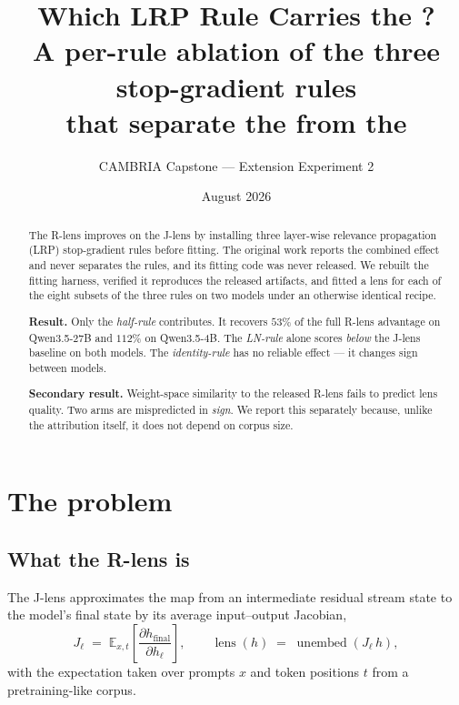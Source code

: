 \documentclass[11pt,a4paper]{article}
\title{\textbf{Which LRP Rule Carries the \rlens?}\\[0.3em]
       \large A per-rule ablation of the three stop-gradient rules\\
       that separate the \rlens{} from the \jlens}
\author{CAMBRIA Capstone --- Extension Experiment 2}
\date{August 2026}
\newcommand{\jlens}{J\nobreakdash-lens}
\newcommand{\rlens}{R\nobreakdash-lens}
\begin{document}
\maketitle

\begin{abstract}
\noindent
The \rlens{} improves on the \jlens{} by installing three layer-wise relevance
propagation (LRP) stop-gradient rules before fitting. The original work reports the
combined effect and never separates the rules, and its fitting code was never
released. We rebuilt the fitting harness, verified it reproduces the released
artifacts, and fitted a lens for each of the eight subsets of the three rules on two
models under an otherwise identical recipe.

\textbf{Result.} Only the \emph{half-rule} contributes. It recovers $53\%$ of the
full \rlens{} advantage on Qwen3.5\nobreakdash-27B and $112\%$ on
Qwen3.5\nobreakdash-4B. The \emph{LN-rule} alone scores \emph{below} the \jlens{}
baseline on both models. The \emph{identity-rule} has no reliable effect --- it
changes sign between models.

\textbf{Secondary result.} Weight-space similarity to the released \rlens{} fails to
predict lens quality. Two arms are mispredicted in \emph{sign}. We report this
separately because, unlike the attribution itself, it does not depend on corpus size.
\end{abstract}

\tableofcontents
\newpage

\section{The problem}

\subsection{What the \rlens{} is}

The \jlens{} approximates the map from an intermediate residual stream state to the
model's final state by its average input--output Jacobian,
\begin{equation}
  J_\ell \;=\; \mathbb{E}_{x,t}\!\left[\frac{\partial h_{\text{final}}}{\partial h_\ell}\right],
  \qquad
  \operatorname{lens}(h) \;=\; \operatorname{unembed}(J_\ell\, h),
\end{equation}
with the expectation taken over prompts $x$ and token positions $t$ from a
pretraining-like corpus.
\end{document}
